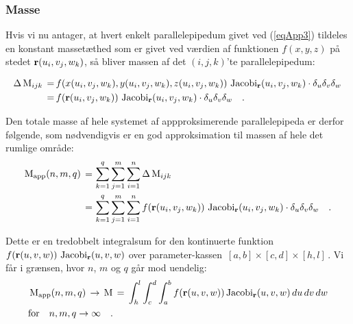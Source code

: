 
\subsubsection{Masse} \label{subsubsecRumMass}
Hvis vi nu antager, at
hvert enkelt parallelepipedum givet ved
(\ref{eqApp3}) tildeles en konstant massetæthed
som er givet ved værdien af funktionen $f(x,y,z)$
på stedet  ${\bf r}(u_{i}, v_{j}, w_{k})$, så
bliver massen af det $(i, j, k)$'te
parallelepipedum:

\begin{equation}
\label{eqDeltaM3}
\begin{aligned}
\Delta \operatorname{M}_{ijk} \, = \, &f(x(u_{i}, v_{j}, w_{k}), y(u_{i}, v_{j},
w_{k}), z(u_{i}, v_{j}, w_{k})) \, \operatorname{Jacobi}_{\bf r}(u_{i}, v_{j}, w_{k})
\cdot\delta_{u} \delta_{v} \delta_{w} \,
\\ = \, &f( {\bf r}(u_{i}, v_{j}, w_{k})) \, \operatorname{Jacobi}_{\bf r}(u_{i},
v_{j}, w_{k}) \cdot\delta_{u} \delta_{v} \delta_{w} \quad .
\end{aligned}
\end{equation}


Den totale masse af hele systemet af
appproksimerende parallelepipeda er derfor
følgende, som nødvendigvis er en god
approksimation til massen af hele det rumlige
område:
\begin{equation}
\begin{aligned}
 \operatorname{M}_{\operatorname{app}}(n,m,q) \, = \,
&\sum_{k=1}^{q}\sum_{j=1}^{m} \sum_{i=1}^{n} \Delta \operatorname{M}_{ijk} \,
\\ = \,
 &\sum_{k=1}^{q}\sum_{j=1}^{m}\sum_{i=1}^{n}f({\bf r}(u_{i}, v_{j}, w_{k}))\,\operatorname{Jacobi}_{\bf r}(u_{i}, v_{j}, w_{k}) \cdot \delta_{u} \delta_{v} \delta_{w}
\quad .
\end{aligned}
\end{equation}

Dette er en tredobbelt integralsum for den kontinuerte funktion
$f({\bf r}(u,v,w))\,\operatorname{Jacobi}_{\bf r}(u, v,w)$ over parameter-kassen
$\,[a, b]\times[c, d]\times[h, l]\,$. Vi får i grænsen, hvor $n$,
$m$ og $q$ går mod uendelig:
\begin{equation}
\begin{aligned}
&\operatorname{M}_{\operatorname{app}}(n,m,q)\, \to \, \operatorname{M} \, = \,
\int_{h}^{l}\int_{c}^{d}\int_{a}^{b}f({\bf r}(u,v,w))\operatorname{Jacobi}_{\bf
r}(u, v, w)\,du \,dv\, dw \\ &\text{for} \quad n, m, q \to
\infty \quad.
\end{aligned}
\end{equation}

